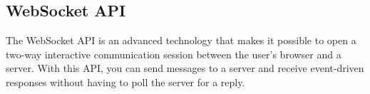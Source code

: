\section{}

\subsection*{WebSocket API}
The WebSocket API is an advanced technology that makes it possible to open a two-way interactive communication session between the user's browser and a server. With this API, you can send messages to a server and receive event-driven responses without having to poll the server for a reply.
